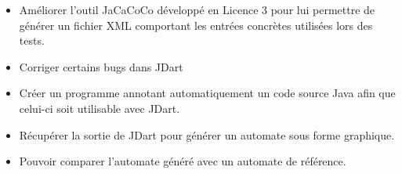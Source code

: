 \begin{itemize}
\item Améliorer l'outil JaCaCoCo développé en Licence 3 pour lui
  permettre de générer un fichier XML comportant les entrées concrètes
  utilisées lors des tests.
\item Corriger certains bugs dans JDart
\item Créer un programme annotant automatiquement un code source Java
  afin que celui-ci soit utilisable avec JDart.
\item Récupérer la sortie de JDart pour générer un automate sous forme
  graphique.
\item Pouvoir comparer l'automate généré avec un automate de
  référence.
\end{itemize}